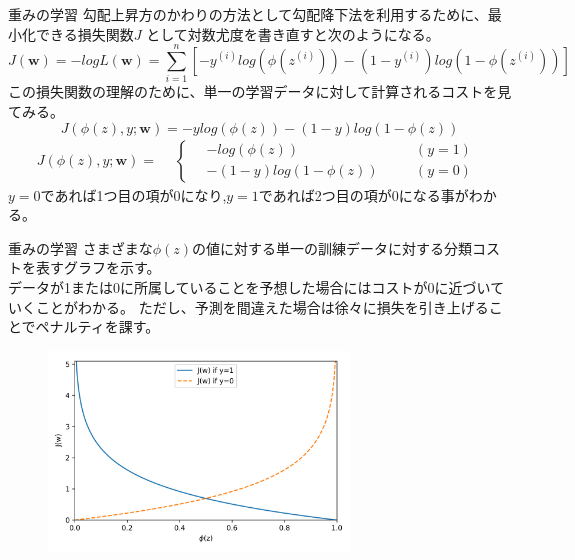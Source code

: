 \documentclass[aspectratio=169, dvipdfmx, 11pt]{beamer} %
\begin{document}
\begin{frame}{重みの学習}
    勾配上昇方のかわりの方法として勾配降下法を利用するために、最小化できる損失関数\(J\)
    として対数尤度を書き直すと次のようになる。
    \begin{equation*}
        J(\bm{w}) = -logL(\bm{w})
        = \sum_{i=1}^{n} [-y^{(i)} log(\phi (z^{(i)})) - (1-y^{(i)})log(1-\phi (z^{(i)}))]
    \end{equation*}
    この損失関数の理解のために、単一の学習データに対して計算されるコストを見てみる。
    \begin{equation*}
        J(\phi (z), y;\bm{w}) = -y log(\phi (z)) - (1-y)log(1-\phi (z))
    \end{equation*}
    \begin{equation*}
        J(\phi (z), y;\bm{w}) = 
        \begin{aligned}
            & \left\{ \,
                \begin{aligned}
                    & - log(\phi (z)) & \quad &(y=1) \\
                    & - (1-y)log(1-\phi (z)) & \quad &(y=0)
                \end{aligned}
            \right.
        \end{aligned}
    \end{equation*}
    \(y=0\)であれば1つ目の項が0になり,\(y=1\)であれば2つ目の項が0になる事がわかる。
\end{frame}

\begin{frame}{重みの学習}
    さまざまな\(\phi(z)\)の値に対する単一の訓練データに対する分類コストを表すグラフを示す。\\
    データが1または0に所属していることを予想した場合にはコストが0に近づいていくことがわかる。
    ただし、予測を間違えた場合は徐々に損失を引き上げることでペナルティを課す。
    \begin{figure}[b]
        \begin{center}
        \includegraphics[width=80mm]{img/day02/fig04.png}
        \end{center}
    \end{figure}
\end{frame}
\end{document}
